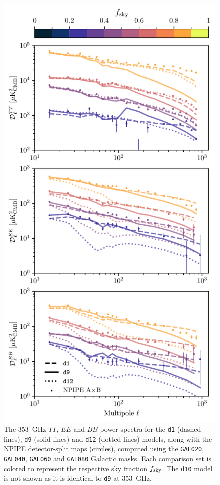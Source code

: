 \documentclass[twocolumn]{aastex631}
\begin{document}
\begin{figure}
    \centering
    \includegraphics[width=\columnwidth]{figures/largefield_power_all_TEB_pub.pdf}
    \caption{The 353~GHz $TT$, $EE$ and $BB$ power spectra for the \texttt{d1} (dashed lines), \texttt{d9} (solid lines) and \texttt{d12} (dotted lines) models, along with the NPIPE detector-split maps (circles), computed using the \texttt{GAL020}, \texttt{GAL040}, \texttt{GAL060} and \texttt{GAL080} Galactic masks. Each comparison set is colored to represent the respective sky fraction $f_{\rm sky}$. The \texttt{d10} model is not shown as it is identical to \texttt{d9} at 353~GHz.}
    \label{fig:largefield_power}
\end{figure}
\end{document}
